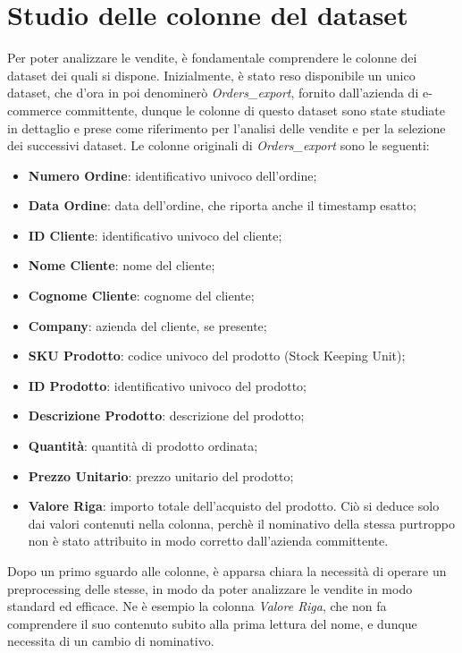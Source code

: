 \section{Studio delle colonne del dataset}
\label{sec:studio-colonne-dataset}
Per poter analizzare le vendite, è fondamentale comprendere le colonne dei dataset dei quali si dispone. Inizialmente, è stato reso disponibile un unico dataset, che d'ora in poi denominerò \emph{Orders\_export}, fornito dall'azienda di e-commerce committente, dunque le colonne di questo dataset sono state studiate in dettaglio e prese come riferimento per l'analisi delle vendite e per la selezione dei successivi dataset. Le colonne originali di \emph{Orders\_export} sono le seguenti:
\begin{itemize}
    \item \textbf{Numero Ordine}: identificativo univoco dell'ordine;
    \item \textbf{Data Ordine}: data dell'ordine, che riporta anche il timestamp esatto;
    \item \textbf{ID Cliente}: identificativo univoco del cliente;
    \item \textbf{Nome Cliente}: nome del cliente;
    \item \textbf{Cognome Cliente}: cognome del cliente;
    \item \textbf{Company}: azienda del cliente, se presente;
    \item \textbf{SKU Prodotto}: codice univoco del prodotto (Stock Keeping Unit);
    \item \textbf{ID Prodotto}: identificativo univoco del prodotto;
    \item \textbf{Descrizione Prodotto}: descrizione del prodotto;
    \item \textbf{Quantità}: quantità di prodotto ordinata;
    \item \textbf{Prezzo Unitario}: prezzo unitario del prodotto;
    \item \textbf{Valore Riga}: importo totale dell'acquisto del prodotto. Ciò si deduce solo dai valori contenuti nella colonna, perchè il nominativo della stessa purtroppo non è stato attribuito in modo corretto dall'azienda committente.
\end{itemize}

Dopo un primo sguardo alle colonne, è apparsa chiara la necessità di operare un \gls{preprocessing} delle stesse, in modo da poter analizzare le vendite in modo standard ed efficace. Ne è esempio la colonna \emph{Valore Riga}, che non fa comprendere il suo contenuto subito alla prima lettura del nome, e dunque necessita di un cambio di nominativo.

